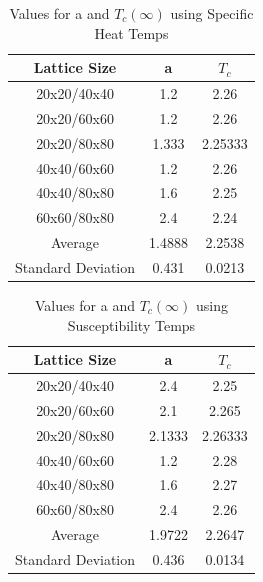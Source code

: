 \documentclass[12pt,righttag]{article}
\begin{document}
		
		\begin{table}
			\begin{center}
				\caption{Values for a and $T_c(\infty)$ using Specific Heat Temps}
				\begin{tabular}{c c c}
					\hline\hline
					Lattice Size & a & $T_c$  \\ 
					\hline
					20x20/40x40 & 1.2 & 2.26\\
					20x20/60x60 & 1.2 & 2.26 \\
					20x20/80x80 & 1.333 & 2.25333 \\
					40x40/60x60 & 1.2 & 2.26  \\
					40x40/80x80 &   1.6 & 2.25    \\
					60x60/80x80 &  2.4  &  2.24  \\
					Average & 1.4888 & 2.2538 \\
					Standard Deviation & 0.431 & 0.0213 \\
					\hline
				\end{tabular}
			\end{center}
		\end{table}
			\begin{table}
				\begin{center}
					\caption{Values for a and $T_c(\infty)$ using Susceptibility Temps}
					\begin{tabular}{c c c}
						\hline\hline
						Lattice Size & a & $T_c$  \\ 
						\hline
						20x20/40x40 & 2.4 & 2.25\\
						20x20/60x60 & 2.1 & 2.265 \\
						20x20/80x80 & 2.1333 & 2.26333 \\
						40x40/60x60 & 1.2 & 2.28  \\
						40x40/80x80 &   1.6 & 2.27    \\
						60x60/80x80 &  2.4  &  2.26  \\
						Average & 1.9722 & 2.2647 \\
						Standard Deviation & 0.436 & 0.0134 \\
						\hline
					\end{tabular}
				\end{center}
			\end{table}
\end{document}
